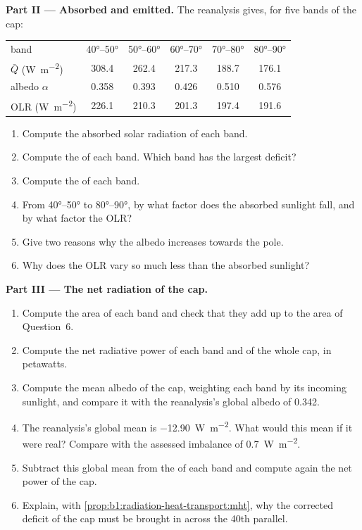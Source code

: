 \begin{problem}
\medskip
\noindent\textbf{Part II --- Absorbed and emitted.} The reanalysis gives, for five
bands of the cap:
\begin{center}
\small
\begin{tabular}{|l|ccccc|}
\hline
band & \ang{40}--\ang{50} & \ang{50}--\ang{60} & \ang{60}--\ang{70} & \ang{70}--\ang{80} & \ang{80}--\ang{90} \\
$\bar Q$ (\unit{W.m^{-2}}) & 308.4 & 262.4 & 217.3 & 188.7 & 176.1 \\
albedo $\alpha$ & 0.358 & 0.393 & 0.426 & 0.510 & 0.576 \\
OLR (\unit{W.m^{-2}}) & 226.1 & 210.3 & 201.3 & 197.4 & 191.6 \\
\hline
\end{tabular}
\end{center}
\begin{enumerate}[resume]
  \item Compute the absorbed solar radiation of each band.
  \item Compute the  of each band. Which band has the largest
        deficit?
  \item Compute the  of each band.
  \item From \ang{40}--\ang{50} to \ang{80}--\ang{90}, by what factor does the
        absorbed sunlight fall, and by what factor the OLR?
  \item Give two reasons why the albedo increases towards the pole.
  \item Why does the OLR vary so much less than the absorbed sunlight?
\end{enumerate}

\medskip
\noindent\textbf{Part III --- The net radiation of the cap.}
\begin{enumerate}[resume]
  \item Compute the area of each band and check that they add up to the area of
        Question~6.
  \item Compute the net radiative power of each band and of the whole cap, in
        petawatts.
  \item Compute the mean albedo of the cap, weighting each band by its incoming
        sunlight, and compare it with the reanalysis's global albedo of \num{0.342}.
  \item The reanalysis's global mean  is \qty{-12.90}{W.m^{-2}}. What
        would this mean if it were real? Compare with the assessed imbalance of
        \qty{+0.7}{W.m^{-2}}.
  \item Subtract this global mean from the  of each band and compute
        again the net power of the cap.
  \item Explain, with \cref{prop:b1:radiation-heat-transport:mht}, why the
        corrected deficit of the cap must be brought in across the 40th parallel.
\end{enumerate}


\end{problem}
